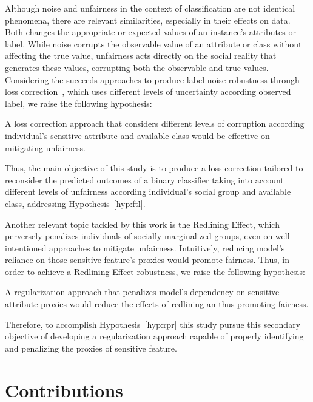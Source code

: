 Although noise and unfairness in the context of classification are not identical phenomena, there are relevant similarities, especially in their effects on data. Both changes the appropriate or expected values of an instance's attributes or label. While noise corrupts the observable value of an attribute or class without affecting the true value, unfairness acts directly on the social reality that generates these values, corrupting both the observable and true values. Considering the succeeds approaches to produce label noise robustness through loss correction~\citep{Patrini2017}, which uses different levels of uncertainty according observed label, we raise the following hypothesis:

\begin{hypothesis}\label{hyp:ftl}
A loss correction approach that considers different levels of corruption according individual's sensitive attribute and available class would be effective on mitigating unfairness. 
\end{hypothesis}

Thus, the main objective of this study is to produce a loss correction tailored to reconsider the predicted outcomes of a binary classifier taking into account different levels of unfairness according individual's social group and available class, addressing Hypothesis~\ref{hyp:ftl}.

Another relevant topic tackled by this work is the Redlining Effect, which perversely penalizes individuals of socially marginalized groups, even on well-intentioned approaches to mitigate unfairness. Intuitively, reducing model's reliance on those sensitive feature's proxies would promote fairness. Thus, in order to achieve a Redlining Effect robustness, we raise the following hypothesis:

\begin{hypothesis}\label{hyp:rpr}
A regularization approach that penalizes model's dependency on sensitive attribute proxies would reduce the effects of redlining an thus promoting fairness. 
\end{hypothesis}

Therefore, to accomplish Hypothesis~\ref{hyp:rpr} this study pursue this secondary objective of developing a regularization approach capable of properly identifying and penalizing the proxies of sensitive feature. 

\section{Contributions}

